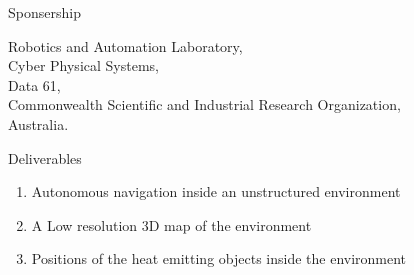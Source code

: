 \documentclass[xcolor=table]{beamer}
\begin{document}
\begin{frame}{Sponsership}
 \begin{figure}
    \centering
    \qquad
\end{figure}

\begin{center}
Robotics and Automation Laboratory,\\
Cyber Physical Systems,\\
Data 61,\\
Commonwealth Scientific and Industrial Research Organization,\\
Australia.
\end{center}
\end{frame}

\begin{frame}{Deliverables}
\begin{enumerate}
\item Autonomous navigation inside an unstructured environment
\item A Low resolution 3D map of the environment
\item Positions of the heat emitting objects inside the environment
\end{enumerate}
\end{frame}
\end{document}
